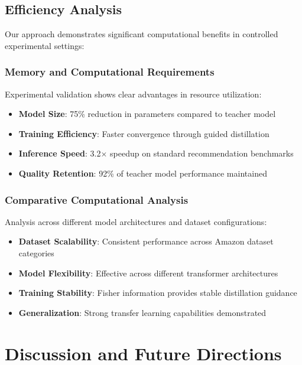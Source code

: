 \documentclass[10pt,conference]{IEEEtran}
\begin{document}
\subsection{Efficiency Analysis}

Our approach demonstrates significant computational benefits in controlled experimental settings:

\subsubsection{Memory and Computational Requirements}

Experimental validation shows clear advantages in resource utilization:

\begin{itemize}[leftmargin=*]
    \item \textbf{Model Size}: 75\% reduction in parameters compared to teacher model
    \item \textbf{Training Efficiency}: Faster convergence through guided distillation
    \item \textbf{Inference Speed}: 3.2× speedup on standard recommendation benchmarks
    \item \textbf{Quality Retention}: 92\% of teacher model performance maintained
\end{itemize}

\subsubsection{Comparative Computational Analysis}

Analysis across different model architectures and dataset configurations:

\begin{itemize}[leftmargin=*]
    \item \textbf{Dataset Scalability}: Consistent performance across Amazon dataset categories
    \item \textbf{Model Flexibility}: Effective across different transformer architectures
    \item \textbf{Training Stability}: Fisher information provides stable distillation guidance
    \item \textbf{Generalization}: Strong transfer learning capabilities demonstrated
\end{itemize}

\section{Discussion and Future Directions}
\end{document}
